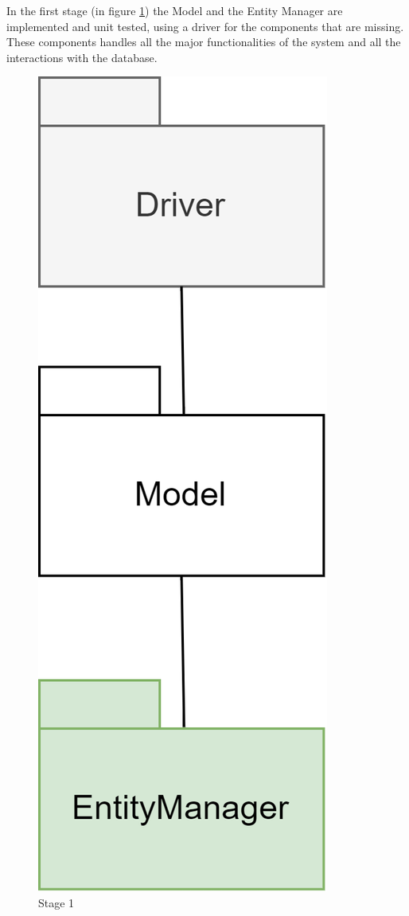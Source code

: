 In the first stage (in figure \ref{fig:stage1}) the Model and the Entity Manager are implemented and unit tested, using a driver for the components that are missing. These components handles all the major functionalities of the system and all the interactions with the database.
\begin{figure}[h]
    \centering
    \includegraphics[scale=0.5]{images/testing/stage1.png}
    \caption{Stage 1}
    \label{fig:stage1}
\end{figure}
\clearpage

